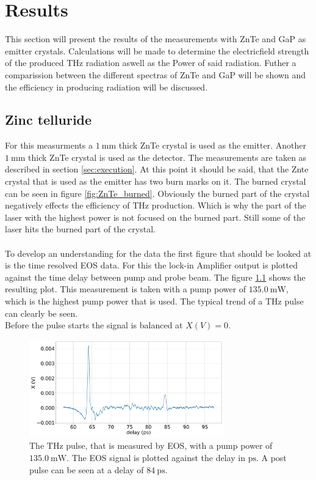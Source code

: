 \chapter{Results}
This section will present the results of the measurements with ZnTe and GaP as emitter crystals.
Calculations will be made to determine the electricfield strength of the produced $\si{\tera\hertz}$ radiation aswell as the Power of said radiation.
Futher a comparission between the different spectras of ZnTe and GaP will be shown and the efficiency in producing radiation will be discussed.

\section{Zinc telluride}
For this measurments a $\SI{1}{\milli\meter}$ thick ZnTe crystal is used as the emitter.
Another $\SI{1}{\milli\meter}$ thick ZnTe crystal is used as the detector.
The measurements are taken as described in section \ref{sec:execution}.
At this point it should be said, that the Znte crystal that is used as the emitter has two burn marks on it.
The burned crystal can be seen in figure \ref{fig:ZnTe_burned}.
Obviously the burned part of the crystal negatively effects the efficiency of $\si{\tera\hertz}$ production.
Which is why the part of the laser with the highest power is not focused on the burned part.
Still some of the laser hits the burned part of the crystal.
\\\\
To develop an understanding for the data the first figure that should be looked at is the time resolved EOS data.
For this the lock-in Amplifier output is plotted against the time delay between pump and probe beam.
The figure \ref{ZnTe:2_11_30_20_signal} shows the resulting plot.
This measurement is taken with a pump power of $\SI{135.0}{\milli\W}$, which is the highest pump power that is used.
The typical trend of a $\si{\tera\hertz}$ pulse can clearly be seen.
\\
Before the pulse starts the signal is balanced at $X(V)=0$.
\begin{figure}
    \centering
    \includegraphics[width=0.75\textwidth]{Plots/2_11_30_20normalX.pdf}
    \caption{The $\si{\tera\hertz}$ pulse, that is measured by EOS, with a pump power of $\SI{135.0}{\milli\W}$.
    The EOS signal is plotted against the delay in $\si{\pico\second}$.
    A post pulse can be seen at a delay of $\SI{84}{\pico\second}$.}
    \label{ZnTe:2_11_30_20_signal}
\end{figure}
